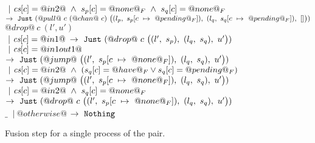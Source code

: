 \begin{figure*}
\begin{tabbing}
\> \> $~|~\cs[c]=@in2@ ~\wedge~ s_p[c]=@none@_F ~\wedge~ s_q[c]=@none@_F$ \\
\> \> $\to~\Just (@pull@~c~(@chan@~c)~
      \nextStep
        {l_p}
          {\HeapUpdateOne{c}{@pending@_F}{s_p}}
        {l_q}
          {\HeapUpdateOne{c}{@pending@_F}{s_q}}
        {[]})
  $
\> \> 
\\[1ex]

\> $@drop@~c~(l',u')$ \\
\> \> $~|~\cs[c]=@in1@$
\> \hspace{5em} $\to~\Just (@drop@~c~
      \nextStep
        {l'}
          {s_p}
        {l_q}
          {s_q}
        {u'})
      $
\>  \\

\> \> $~|~\cs[c]=@in1out1@$
\> \hspace{5em} $\to~\Just (@jump@~
      \nextStep
        {l'}
          {\HeapUpdateOne{c}{@none@_F}{s_p}}
        {l_q}
          {s_q}
        {u'})
      $
\> \\

\> \> $~|~\cs[c]=@in2@ ~\wedge~ (s_q[c]=@have@_F \vee s_q[c]=@pending@_F)$ 
\> \hspace{5em} $\to~\Just (@jump@~
      \nextStep
        {l'}
          {\HeapUpdateOne{c}{@none@_F}{s_p}}
        {l_q}
          {s_q}
        {u'})
      $
\> \\



\> \> $~|~\cs[c]=@in2@ ~\wedge~ s_q[c]=@none@_F$
\> \hspace{5em} $\to~\Just (@drop@~c~
      \nextStep
        {l'}
          {\HeapUpdateOne{c}{@none@_F}{s_p}}
        {l_q}
          {s_q}
        {u'})
      $
\> \\[1ex]

\> $\_$ \> $~|~ @otherwise@ $
\> \hspace{5em} $\to ~ \Nothing$
\> 

\end{tabbing}

\caption{Fusion step for a single process of the pair.} 

\label{fig:Fusion:Def:Step}
\end{figure*}

